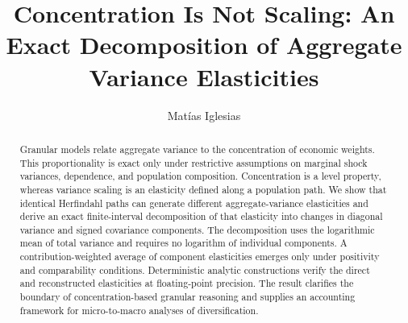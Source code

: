 \documentclass[a4paper,fleqn]{cas-dc}
\begin{document}
\let\WriteBookmarks\relax
\def\floatpagepagefraction{1}
\def\textpagefraction{0.001}




\title[mode=title]{
Concentration Is Not Scaling:
An Exact Decomposition of Aggregate Variance Elasticities
}


\author[1]{Matías Iglesias}
\cormark[1]







\begin{abstract}
Granular models relate aggregate variance to the concentration of
economic weights. This proportionality is exact only under restrictive
assumptions on marginal shock variances, dependence, and population
composition. Concentration is a level property, whereas variance
scaling is an elasticity defined along a population path. We show that
identical Herfindahl paths can generate different aggregate-variance
elasticities and derive an exact finite-interval decomposition of that
elasticity into changes in diagonal variance and signed covariance
components. The decomposition uses the logarithmic mean of total
variance and requires no logarithm of individual components. A
contribution-weighted average of component elasticities emerges only
under positivity and comparability conditions. Deterministic analytic
constructions verify the direct and reconstructed elasticities at
floating-point precision. The result clarifies the boundary of
concentration-based granular reasoning and supplies an accounting
framework for micro-to-macro analyses of diversification.
\end{abstract}
\end{document}
